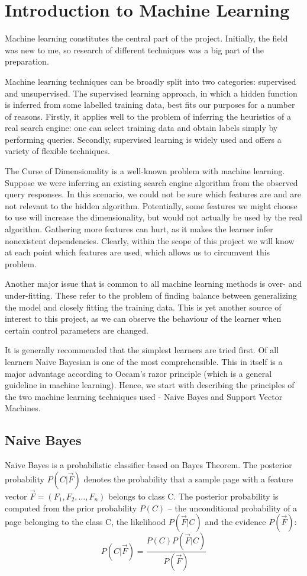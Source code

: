 \documentclass[12pt,notitlepage,twoside]{scrreprt}
\begin{document}
\section{Introduction to Machine Learning}

Machine learning constitutes the central part of the project. Initially, the field was new
to me, so research of different techniques was a big part of the preparation.

Machine learning techniques can be broadly split into two categories: supervised and
unsupervised. The supervised learning approach, in which a hidden function is inferred
from some labelled training data, best fits our purposes for a number of reasons. Firstly,
it applies well to the problem of inferring the heuristics of a real search engine: one
can select training data and obtain labels simply by performing queries. Secondly,
supervised learning is widely used and offers a variety of flexible techniques.

The Curse of Dimensionality is a well-known problem with machine learning. Suppose we were
inferring an existing search engine algorithm from the observed query responses. In this
scenario, we could not be sure which features are and are not relevant to the hidden
algorithm. Potentially, some features we might choose to use will increase the
dimensionality, but would not actually be used by the real algorithm. Gathering more
features can hurt, as it makes the learner infer nonexistent dependencies. Clearly, within
the scope of this project we will know at each point which features are used, which allows
us to circumvent this problem.

Another major issue that is common to all machine learning methods is over- and
under-fitting. These refer to the problem of finding balance between generalizing the
model and closely fitting the training data. This is yet another source of interest to
this project, as we can observe the behaviour of the learner when certain control
parameters are changed.

It is generally recommended that the simplest learners are tried
first\cite{domingos}. Of all learners Naive Bayesian is one of the most
comprehensible. This in itself is a major advantage according to Occam's razor
principle (which is a general guideline in machine learning).
Hence, we start with describing the principles of the two machine learning
techniques used - Naive Bayes and Support Vector Machines.

\subsection{Naive Bayes}
\label{prep:nb}
Naive Bayes is a probabilistic classifier based on Bayes Theorem. The
posterior probability \(P(C|\vec{F})\) denotes the probability that a sample
page with a feature vector \(\vec{F}=(F_1,F_2,\dots,F_n)\) belongs to class C.
The posterior probability is computed from the prior
probability \(P(C)\) -- the unconditional probability of a page belonging to
the class C, the likelihood \(P(\vec{F}|C)\) and the evidence \(P(\vec{F})\):
\begin{equation}
P(C|\vec{F}) = \frac{P(C)P(\vec{F}|C)}{P(\vec{F})}
\end{equation}
\end{document}
